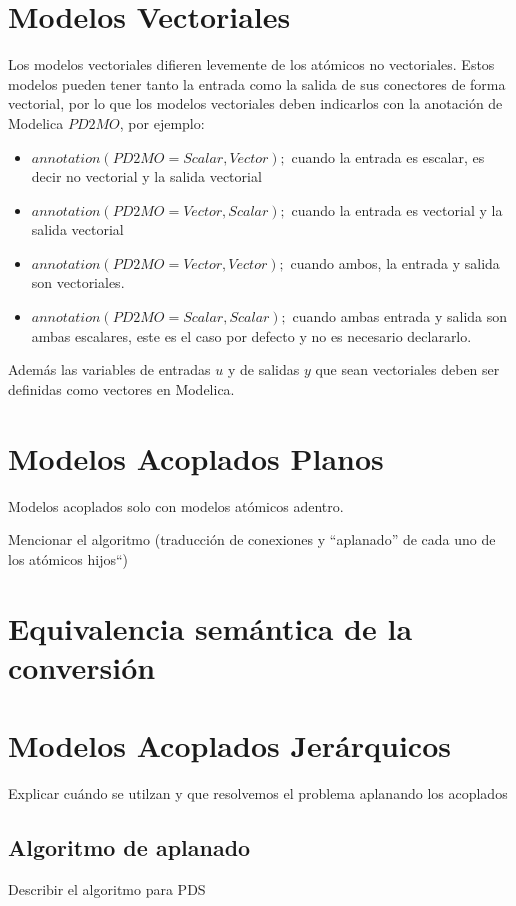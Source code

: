 \documentclass[a4paper,	11pt]{report}
\begin{document}
\section{Modelos Vectoriales}
Los modelos vectoriales difieren levemente de los atómicos no vectoriales. Estos modelos pueden tener tanto la entrada como la salida de sus conectores de forma vectorial, por lo que los modelos vectoriales deben indicarlos con la anotación de Modelica $PD2MO$, por ejemplo:
\begin{itemize}
\item $annotation(PD2MO = {Scalar, Vector});$ cuando la entrada es escalar, es decir no vectorial y la salida vectorial
\item $annotation(PD2MO = {Vector, Scalar});$ cuando la entrada es vectorial y la salida vectorial
\item $annotation(PD2MO = {Vector, Vector});$ cuando ambos, la entrada y salida son vectoriales.
\item $annotation(PD2MO = {Scalar, Scalar});$ cuando ambas entrada y salida son ambas escalares, este es el caso por defecto y no es necesario declararlo.
\end{itemize}

Además las variables de entradas $u$ y de salidas $y$ que sean vectoriales deben ser definidas como vectores en Modelica.

\section{Modelos Acoplados Planos}
Modelos acoplados solo con modelos atómicos adentro.	

Mencionar el algoritmo (traducción de conexiones y ``aplanado'' de cada uno de los atómicos hijos``)	

\section{Equivalencia semántica de la conversión}

\section{Modelos Acoplados Jerárquicos}
Explicar cuándo se utilzan y que resolvemos el problema aplanando los acoplados

\subsection{Algoritmo de aplanado}
Describir el algoritmo para PDS
\end{document}

